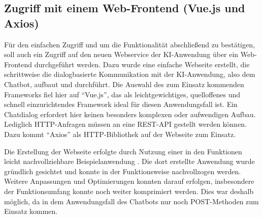 \documentclass[12pt,oneside,titlepage,listof=totoc,bibliography=totoc]{scrartcl}
\begin{document}
\subsection{Zugriff mit einem Web-Frontend (Vue.js und Axios)}

Für den einfachen Zugriff und um die Funktionalität abschließend zu bestätigen, soll auch ein Zugriff auf den neuen Webservice der KI-Anwendung über ein Web-Frontend durchgeführt werden. Dazu wurde eine einfache Webseite erstellt, die schrittweise die dialogbasierte Kommunikation mit der KI-Anwendung, also dem Chatbot, aufbaut und durchführt. Die Auswahl des zum Einsatz kommenden Frameworks fiel hier auf \enquote{Vue.js}, das als leichtgewichtiges, quelloffenes und schnell einzurichtendes Framework ideal für diesen Anwendungsfall ist. Ein Chatdialog erfordert hier keinen besonders komplexen oder aufwendigen Aufbau. Lediglich HTTP-Anfragen müssen an eine REST-API gestellt werden können. Dazu kommt \enquote{Axios} als HTTP-Bibliothek auf der Webseite zum Einsatz.  

Die Erstellung der Webseite erfolgte durch Nutzung einer in den Funktionen leicht nachvollziehbare Beispielanwendung \parencite{58-howto-vue}. Die dort erstellte Anwendung wurde gründlich gesichtet und konnte in der Funktionsweise nachvollzogen werden. Weitere Anpassungen und Optimierungen konnten darauf erfolgen, insbesondere der Funktionsumfang konnte noch weiter komprimiert  werden. Dies war deshalb möglich, da in dem Anwendungsfall des Chatbots nur noch POST-Methoden zum Einsatz kommen. 
\end{document}
